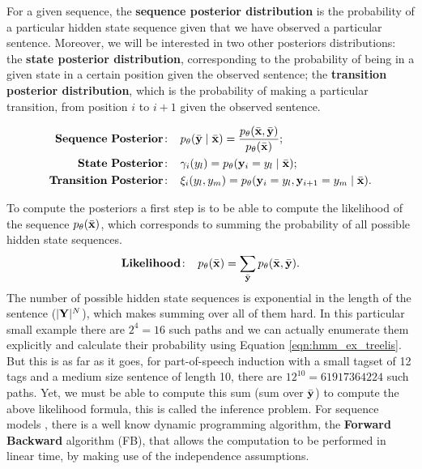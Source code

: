 For a given sequence, the \textbf{sequence posterior distribution} is the probability of a particular
hidden state sequence given that we have observed a particular
sentence. Moreover, we will be interested in two other posteriors distributions:
the \textbf{state posterior distribution}, corresponding to the
probability of being in a given state in a certain position given the
observed sentence; the \textbf{transition posterior distribution},
which is the probability of making a particular transition, from position $i$ to
$i+1$ given the observed sentence. 

\begin{align}
  \mathbf{Sequence \ Posterior\!:}\;\;\;\; &p_{\theta}(\bar{\mathbf{y}} \mid \bar{\mathbf{x}}) = \frac{p_{\theta}(\bar{\mathbf{x}} ,\bar{\mathbf{y}})}{p_{\theta}(\bar{\mathbf{x}})}; \label{eq::posteriorDistribution} \\
 \mathbf{State \ Posterior\!:}\;\;\;\;  & \gamma_i({y}_l) = p_\theta(\mathbf{y}_i = {y}_l \mid \bar{\mathbf{x}}); \label{eq::nodePosterior} \\
 \mathbf{Transition \ Posterior\!:}\;\;\;\;  &\xi_i({y}_l,{y}_m) = p_\theta(\mathbf{y}_i = {y}_l, \mathbf{y}_{i+1}= {y}_m  \mid \bar{\mathbf{x}}).\label{eq::edgePosterior}
\end{align}

To compute the posteriors a first step is to be able to compute the 
likelihood of
the sequence $p_{\theta}(\bar{\mathbf{x}})$, which corresponds to summing the probability of all
possible hidden state sequences.
\begin{equation}
\label{likelihoood}
\mathbf{Likelihood\!:}\;\;\;\; p_{\theta}(\bar{\mathbf{x}}) = \displaystyle \sum_{\bar{\mathbf{y}}} p_{\theta}(\bar{\mathbf{x}} ,\bar{\mathbf{y}}).
\end{equation}
The number of possible hidden state sequences is exponential in the
length of the sentence ($|\mathbf{Y}|^N$),
 which makes summing over all of them hard. In this particular small
 example there are $2^4 = 16$ such paths and we can actually enumerate
 them explicitly and calculate their probability using Equation \ref{eqn:hmm_ex_treelis}. But this is as far as it goes, for part-of-speech
 induction with a small tagset of 12 tags and a medium size
 sentence of length 10, there are $12^{10} = 61 917 364 224$ such
 paths. 
Yet, we must be able to compute this sum (sum over $\bar{\mathbf{y}}$) to compute the above likelihood
formula, this is called the inference problem. For sequence models , there is a well know dynamic programming algorithm,
the \textbf{Forward Backward} algorithm (FB), that allows the computation
to be performed in linear time, by making use of the independence assumptions.

